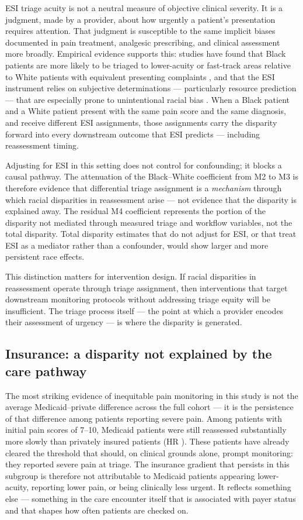 ESI triage acuity is not a neutral measure of objective clinical severity.
It is a judgment, made by a provider, about how urgently a patient's presentation requires attention.
That judgment is susceptible to the same implicit biases documented in pain treatment, analgesic prescribing, and clinical assessment more broadly.
Empirical evidence supports this: studies have found that Black patients are more likely to be triaged to lower-acuity or fast-track areas relative to White patients with equivalent presenting complaints \citep{Vigil2014,Pines2009}, and that the ESI instrument relies on subjective determinations --- particularly resource prediction --- that are especially prone to unintentional racial bias \citep{Fernandes2005}.
When a Black patient and a White patient present with the same pain score and the same diagnosis, and receive different ESI assignments, those assignments carry the disparity forward into every downstream outcome that ESI predicts --- including reassessment timing.

Adjusting for ESI in this setting does not control for confounding; it blocks a causal pathway.
The attenuation of the Black--White coefficient from M2 to M3 is therefore evidence that differential triage assignment is a \textit{mechanism} through which racial disparities in reassessment arise --- not evidence that the disparity is explained away.
The residual M4 coefficient represents the portion of the disparity not mediated through measured triage and workflow variables, not the total disparity.
Total disparity estimates that do not adjust for ESI, or that treat ESI as a mediator rather than a confounder, would show larger and more persistent race effects.

This distinction matters for intervention design.
If racial disparities in reassessment operate through triage assignment, then interventions that target downstream monitoring protocols without addressing triage equity will be insufficient.
The triage process itself --- the point at which a provider encodes their assessment of urgency --- is where the disparity is generated.

\subsection{Insurance: a disparity not explained by the care pathway}

The most striking evidence of inequitable pain monitoring in this study is not the average Medicaid--private difference across the full cohort --- it is the persistence of that difference among patients reporting severe pain.
Among patients with initial pain scores of 7--10, Medicaid patients were still reassessed substantially more slowly than privately insured patients (HR \HRMedicaidSevere{}).
These patients have already cleared the threshold that should, on clinical grounds alone, prompt monitoring: they reported severe pain at triage.
The insurance gradient that persists in this subgroup is therefore not attributable to Medicaid patients appearing lower-acuity, reporting lower pain, or being clinically less urgent.
It reflects something else --- something in the care encounter itself that is associated with payer status and that shapes how often patients are checked on.

